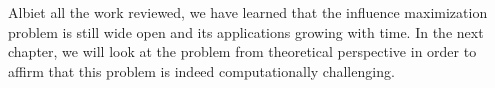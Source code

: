 Albiet all the work reviewed, we have learned that the influence maximization problem is still wide open and its applications growing with time. In the next chapter, we will look at the problem from theoretical perspective in order to affirm that this problem is indeed computationally challenging.

